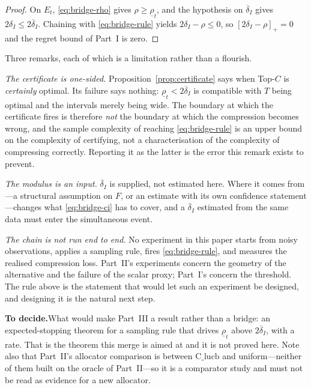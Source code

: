 \documentclass[conference]{IEEEtran}
\theoremstyle{definition}
\newif\ifshownotes\shownotestrue
\newcommand{\TODOPAR}[1]{\ifshownotes\par\vspace{2pt}\noindent%
  {\color{todocol}\textsf{\footnotesize\textbf{To decide.}\;#1}}\par\vspace{2pt}\fi}
\begin{document}
\begin{proof}
On $E_{t}$, \eqref{eq:bridge-rho} gives $\rho\ge\underline{\rho}_{t}$, and the hypothesis on
$\overline{\delta}_{I}$ gives $2\delta_{I}\le2\overline{\delta}_{I}$. Chaining with
\eqref{eq:bridge-rule} yields $2\delta_{I}-\rho\le0$, so $[2\delta_{I}-\rho]_{+}=0$ and the
regret bound of Part~I is zero.
\end{proof}

Three remarks, each of which is a limitation rather than a flourish.

\emph{The certificate is one-sided.} Proposition~\ref{prop:certificate} says when Top-$C$ is
\emph{certainly} optimal. Its failure says nothing: $\underline{\rho}_{t}<2\overline
{\delta}_{I}$ is compatible with $T$ being optimal and the intervals merely being wide. The
boundary at which the certificate fires is therefore \emph{not} the boundary at which the
compression becomes wrong, and the sample complexity of reaching \eqref{eq:bridge-rule} is an
upper bound on the complexity of certifying, not a characterisation of the complexity of
compressing correctly. Reporting it as the latter is the error this remark exists to prevent.

\emph{The modulus is an input.} $\overline{\delta}_{I}$ is supplied, not estimated here.
Where it comes from---a structural assumption on $F$, or an estimate with its own confidence
statement---changes what \eqref{eq:bridge-ci} has to cover, and a $\overline{\delta}_{I}$
estimated from the same data must enter the simultaneous event.

\emph{The chain is not run end to end.} No experiment in this paper starts from noisy
observations, applies a sampling rule, fires \eqref{eq:bridge-rule}, and measures the realised
compression loss. Part~II's experiments concern the geometry of the alternative and the
failure of the scalar proxy; Part~I's concern the threshold. The rule above is the statement
that would let such an experiment be designed, and designing it is the natural next step.

\TODOPAR{What would make Part~III a result rather than a bridge: an expected-stopping theorem
for a sampling rule that drives $\underline{\rho}_{t}$ above $2\overline{\delta}_{I}$, with a
rate. That is the theorem this merge is aimed at and it is not proved here. Note also that
Part~II's allocator comparison is between $\mathrm{C\_lucb}$ and uniform---neither of them
built on the oracle of Part~II---so it is a comparator study and must not be read as evidence
for a new allocator.}
\end{document}

